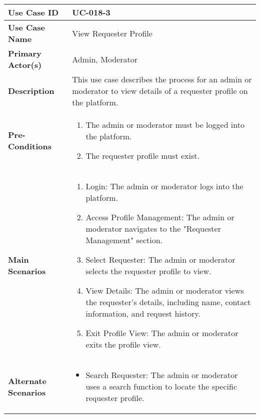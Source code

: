 \begin{table}[!ht]
    \centering
    \renewcommand{\arraystretch}{1.3} %
    \begin{tabularx}{\textwidth}{|l|X|}
        \hline
        \textbf{Use Case ID} & UC-018-3 \\
        \hline
        \textbf{Use Case Name} & View Requester Profile \\
        \hline
        \textbf{Primary Actor(s)} & Admin, Moderator \\
        \hline
        \textbf{Description} & This use case describes the process for an admin or moderator to view details of a requester profile on the platform. \\
        \hline
        \textbf{Pre-Conditions} & 
        \begin{enumerate}[label=\arabic*.,itemsep=0pt]
            \item The admin or moderator must be logged into the platform.
            \item The requester profile must exist.
        \end{enumerate} \\
        \hline
        \textbf{Main Scenarios} & 
        \begin{enumerate}[label=\arabic*.,itemsep=0pt]
            \item Login: The admin or moderator logs into the platform.
            \item Access Profile Management: The admin or moderator navigates to the "Requester Management" section.
            \item Select Requester: The admin or moderator selects the requester profile to view.
            \item View Details: The admin or moderator views the requester's details, including name, contact information, and request history.
            \item Exit Profile View: The admin or moderator exits the profile view.
        \end{enumerate} \\
        \hline
        \textbf{Alternate Scenarios} & 
        \begin{itemize}[label=--,itemsep=0pt]
            \item Search Requester: The admin or moderator uses a search function to locate the specific requester profile.
        \end{itemize} \\
        \hline

\end{tabularx}
\end{table}
